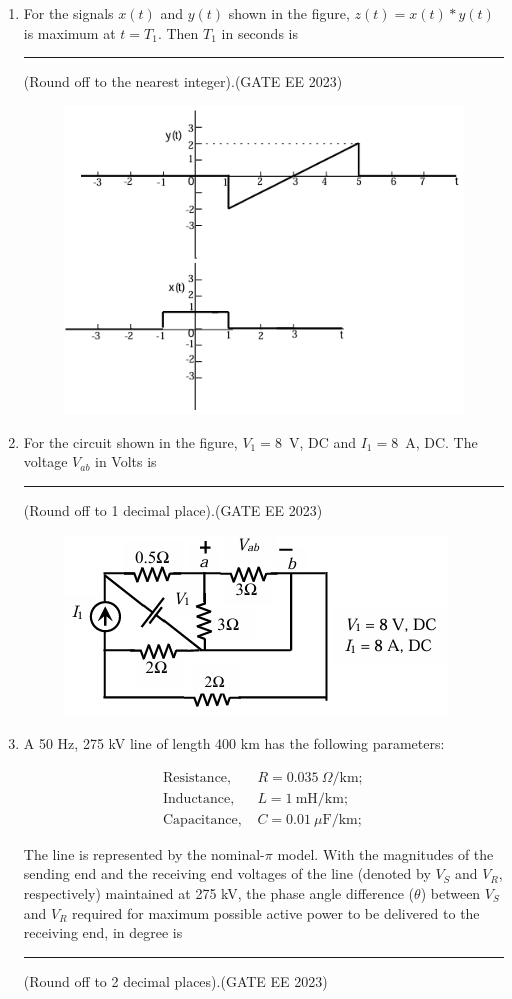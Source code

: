 \documentclass[a4paper,12pt]{exam}
\theoremstyle{remark}
\begin{document}
\begin{enumerate}
\item For the signals $x(t)$ and $y(t)$ shown in the figure, $z(t) = x(t) * y(t)$ is maximum at $t = T_1$. Then $T_1$ in seconds is \rule{2cm}{0.15mm} (Round off to the nearest integer).\hfill{(GATE EE 2023)}
\newpage
\begin{figure}[H]
    \centering
    \includegraphics[width=0.5\columnwidth]{figs/Q 31.png}
    \caption{}
    \label{fig:placeholder}
\end{figure}


\item For the circuit shown in the figure, $V_1 = 8$~V, DC and $I_1 = 8$~A, DC. The voltage $V_{ab}$ in Volts is \rule{2cm}{0.15mm} (Round off to 1 decimal place).\hfill{(GATE EE 2023)}
\begin{figure}[H]
    \centering
    \includegraphics[width=0.5\columnwidth]{figs/Q 32.png}
    \caption{}
    \label{fig:placeholder}
\end{figure}

\item A 50 Hz, 275 kV line of length 400 km has the following parameters:

\begin{align*}
\text{Resistance, } & R = 0.035~\Omega/\text{km}; \\
\text{Inductance, } & L = 1~\text{mH}/\text{km}; \\
\text{Capacitance, } & C = 0.01~\mu\text{F}/\text{km};
\end{align*}

The line is represented by the nominal-$\pi$ model. With the magnitudes of the sending end and the receiving end voltages of the line (denoted by $V_S$ and $V_R$, respectively) maintained at 275 kV, the phase angle difference ($\theta$) between $V_S$ and $V_R$ required for maximum possible active power to be delivered to the receiving end, in degree is \rule{2cm}{0.15mm} (Round off to 2 decimal places).\hfill{(GATE EE 2023)}


\end{enumerate}
\end{document}
